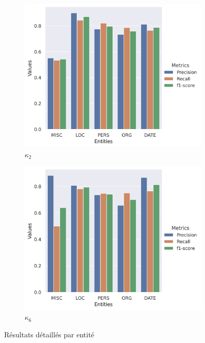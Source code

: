 	\begin{figure}[H]
         \centering
         \begin{subfigure}[b]{0.4\textwidth}
             \centering
             \includegraphics[width=\textwidth]{annexes/graph/k2.png}
             \caption{$\kappa_2$}
             \label{fig:k2}
         \end{subfigure}
         \hfill
         \begin{subfigure}[b]{0.4\textwidth}
             \centering
             \includegraphics[width=\textwidth]{annexes/graph/k6.png}
             \caption{$\kappa_6$}
             \label{fig:k6}
         \end{subfigure}
         \caption{Résultats détaillés par entité}
        \label{fig:ner_results}
    \end{figure}
    
